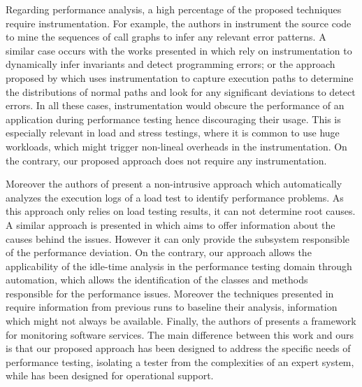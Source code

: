 \documentclass[runningheads,a4paper]{llncs}
\begin{document}
Regarding performance analysis, a high percentage of the proposed
techniques require instrumentation. For example, the authors in \cite{Yang1}
instrument the source code to mine the sequences of call graphs to infer any
relevant error patterns. A similar case occurs with the works presented in
\cite{Hangal1,Csallner1} which rely on instrumentation to dynamically infer
invariants and detect programming errors; or the approach proposed by
\cite{Chen2} which uses instrumentation to capture execution paths to determine
the distributions of normal paths and look for any significant deviations to
detect errors. In all these cases, instrumentation would obscure the performance
of an application during performance testing hence discouraging their usage.
This is especially relevant in load and stress testings, where it is common to
use huge workloads, which might trigger non-lineal overheads in the
instrumentation. On the contrary, our proposed approach does not require any
instrumentation.

Moreover the authors of \cite{Jiang2009} present a non-intrusive approach which
automatically analyzes the execution logs of a load test to identify performance
problems. As this approach only relies on load testing results, it can not
determine root causes. A similar approach is presented in \cite{Malik1} which
aims to offer information about the causes behind the issues. However it can
only provide the subsystem responsible of the performance deviation. On the
contrary, our approach allows the applicability of the idle-time analysis in the
performance testing domain through automation, which allows the identification
of the classes and methods responsible for the performance issues. Moreover the
techniques presented in \cite{Jiang2009,Malik1} require information from
previous runs to baseline their analysis, information which might not
always be available. Finally, the authors of \cite{mon3} presents a framework
for monitoring software services. The main difference between this work and ours is 
that our proposed approach has been designed to address the specific needs of
performance testing, isolating a tester from the complexities of an expert system, 
while \cite{mon3} has been designed for operational support.


\vspace{-7pt}
\end{document}
